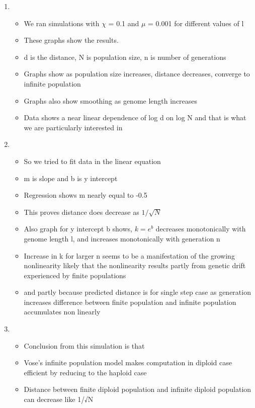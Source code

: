 \documentclass{article}
\begin{document}
\begin{enumerate}
\item
  \begin{itemize}
  \item We ran simulations with $\chi$ = 0.1 and $\mu$ = 0.001 for
    different values of l
  \item These graphs show the results.
  \item d is the distance, N is population size, n is number of
    generations
  \item Graphs show as population size increases, distance decreases,
    converge to infinite population
  \item Graphs also show smoothing as genome length increases
  \item Data shows a near linear dependence of log d on log N and that
    is what we are particularly interested in
  \end{itemize}
    
\item
  \begin{itemize}
  \item So we tried to fit data in the linear equation
  \item m is slope and b is y intercept
  \item Regression shows m nearly equal to -0.5
  \item This proves distance does decrease as $1/\sqrt{N}$
  \item Also graph for y intercept b shows, $k = e^b$ decreases
    monotonically with genome length l, and increases monotonically
    with generation n
  \item Increase in k for larger n seems to be a manifestation of the
    growing nonlinearity likely that the nonlinearity results partly
    from genetic drift experienced by finite populations
  \item and partly because predicted distance is for single step case
    as generation increases difference between finite population and
    infinite population accumulates non linearly
  \end{itemize}

\item
  \begin{itemize}
  \item Conclusion from this simulation is that
  \item Vose's infinite population model makes computation in diploid
     case efficient by reducing to the haploid case
  \item Distance between finite diploid population and infinite
    diploid population can decrease like 1/√N
  \end{itemize}


\end{enumerate}
\end{document}
